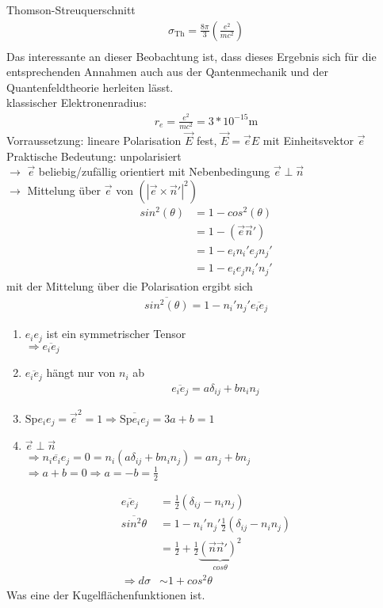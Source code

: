 \documentclass[a4paper]{article}
\begin{document}
Thomson-Streuquerschnitt
\begin{align}
\sigma_{\text{Th}}=\frac{8\pi}{3}\left( \frac{e^2}{mc^2} \right)\\
\end{align}
Das interessante an dieser Beobachtung ist, dass dieses Ergebnis sich für die
entsprechenden Annahmen auch aus der Qantenmechanik und der Quantenfeldtheorie
herleiten lässt.\\
klassischer Elektronenradius:\\
\begin{align}
r_e=\frac{e^2}{mc^2}=3*10^{-15}\mathrm{m}
\end{align}
Vorraussetzung: lineare Polarisation
$\vec{E}$ fest, $\vec{E}=\vec{e}E$ mit Einheitsvektor $\vec{e}$\\
Praktische Bedeutung: unpolarisiert\\
$\longrightarrow$ $\vec{e}$ beliebig/zufällig orientiert mit Nebenbedingung
$\vec{e}\perp\vec{n}$\\
$\longrightarrow$ Mittelung über $\vec{e}$ von $\left( |\vec{e}\times\vec{n}'|^2
\right)$
\begin{align}
sin^2(\theta)&=1-cos^2(\theta)\\
&=1-(\vec{e}\vec{n}')\\
&=1-e_i {n_i}'e_j {n_j}'\\
&=1-e_ie_j {n_i}'{n_j}'
\end{align}
mit der Mittelung über die Polarisation ergibt sich
\begin{align}
\overline{sin^2(\theta)}=1-{n_i}'{n_j}' \overline{e_ie_j}
\end{align}
\begin{enumerate}
  \item $e_ie_j$ ist ein symmetrischer Tensor \\ $\Rightarrow\overline{e_ie_j}$
  \item $\overline{e_ie_j}$ hängt nur von $n_i$ ab
 	\begin{align}
		\overline{e_ie_j}=a\delta_{ij}+bn_in_j
	\end{align}
 \item $\mathrm{Sp}e_ie_j=\vec{e}^2=1
 \Rightarrow\overline{\mathrm{Sp}e_ie_j}=3a+b=1$
 \item $\vec{e}\perp\vec{n}$\\ $\Rightarrow \overline{n_ie_ie_j}=0
 =n_i(a\delta_{ij}+bn_in_j)=an_j+bn_j$ \\ $\Rightarrow a+b=0 \Rightarrow
 a=-b=\frac{1}{2}$
\end{enumerate}
\begin{align}
\overline{e_ie_j}&=\frac{1}{2}\left(\delta_{ij}-n_in_j \right)\\
\overline{sin^2\theta}&=1-{n_i}'{n_j}'\frac{1}{2}\left(\delta_{ij}-n_in_j
\right)\\
&=\frac{1}{2}+\frac{1}{2}\underbrace{\left( \vec{n}\vec{n}'
\right)^2}_{cos\theta}\\
\Rightarrow d\sigma&\sim1+cos^2\theta
\end{align}
Was eine der Kugelflächenfunktionen ist.
\end{document}
